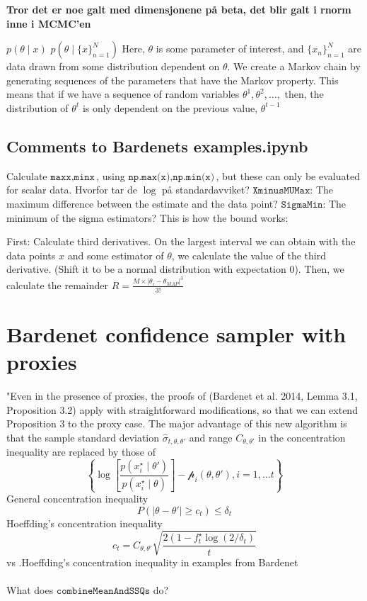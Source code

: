 \textbf{Tror det er noe galt med dimensjonene på beta, det blir galt i rnorm inne i MCMC'en}


$p\left(\theta\mid x\right)$  $p(\theta\mid \{x\}_{n=1}^N)$
Here, $\theta$ is some parameter of interest, and $\{x_n\}_{n=1}^N$ are data drawn from some distribution dependent on $\theta$. We create a Markov chain by generating sequences of the parameters that have the Markov property. This means that if we have a sequence of random variables $\theta^1, \theta^2, \ldots,$ then, the distribution of $\theta^t$ is only dependent on the previous value, $\theta^{t-1}$ 



\subsection{Comments to Bardenets examples.ipynb}
Calculate $\texttt{maxx}, \texttt{minx}$, using $\texttt{np.max(x)}, \texttt{np.min(x)}$, but these can only be evaluated for scalar data.
Hvorfor tar de $\log$ på standardavviket? 
$\texttt{XminusMUMax}$: The maximum difference between the estimate and the data point? $\texttt{SigmaMin}$: The minimum of the sigma estimators?
This is how the bound works: 

First: Calculate third derivatives. On the largest interval we can obtain with the data points $x$ and some estimator of $\theta$, we calculate the value of the third derivative. (Shift it to be a normal distribution with expectation 0). Then, we calculate the remainder $R = \frac{M\times|\theta_i-\theta_{MAP}|^3}{3!}$

\section{Bardenet confidence sampler with proxies}
"Even in the presence of proxies, the proofs of (Bardenet et al. 2014, Lemma 3.1, Proposition 3.2) apply with straightforward modifications, so that we can extend Proposition 3 to the proxy case. The major advantage of this new algorithm is that the sample standard deviation $\hat{\sigma}_{t, \theta, \theta'}$ and range $C_{\theta, \theta'}$ in the concentration inequality are replaced by those of 
$$\left\{\log\left[\frac{p\left(x_i^{\star}\mid \theta'\right)}{p\left(x_i^{\star}\mid \theta\right)}\right] - \mathscr{p}_i\left(\theta, \theta'\right), i = 1, \ldots t\right\}$$
General concentration inequality 
\begin{equation}
P\left(\mid \theta - \theta'\mid \geq c_t \right) \leq \delta_t   
\end{equation}{}
Hoeffding's concentration inequality 
\begin{equation*}
    c_t = C_{\theta, \theta'} \sqrt{\frac{2\left(1-f_t^{\star}\log\left(2/\delta_t\right)}{t}}
\end{equation*}
vs .Hoeffding's concentration inequality in examples from Bardenet
\\ \\ 
What does $\texttt{combineMeanAndSSQs}$ do?

 